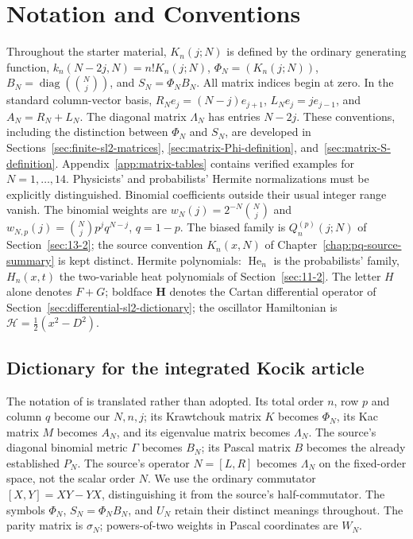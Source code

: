 \documentclass[11pt,oneside]{amsbook}
\theoremstyle{definition}
\theoremstyle{remark}
\begin{document}
\chapter*{Notation and Conventions}
Throughout the starter material, $K_n(j;N)$ is defined by the ordinary generating function, $k_n(N-2j,N)=n!K_n(j;N)$, $\Phi_N=(K_n(j;N))$, $B_N=\operatorname{diag}(\binom Nj)$, and $S_N=\Phi_NB_N$. All matrix indices begin at zero. In the standard column-vector basis,
$R_Ne_j=(N-j)e_{j+1}$, $L_Ne_j=je_{j-1}$, and $A_N=R_N+L_N$.
The diagonal matrix $\Lambda_N$ has entries $N-2j$.
These conventions, including the distinction between $\Phi_N$ and
$S_N$, are developed in Sections~\ref{sec:finite-sl2-matrices},
\ref{sec:matrix-Phi-definition}, and~\ref{sec:matrix-S-definition}.
Appendix~\ref{app:matrix-tables} contains verified examples for
$N=1,\ldots,14$. Physicists' and probabilists' Hermite normalizations must be explicitly distinguished. Binomial coefficients outside their usual integer range vanish.
The binomial weights are $w_N(j)=2^{-N}\binom Nj$ and
$w_{N,p}(j)=\binom Njp^jq^{N-j}$, $q=1-p$. The biased family is
$Q_n^{(p)}(j;N)$ of Section~\ref{sec:13-2}; the source convention
$K_n(x,N)$ of Chapter~\ref{chap:pq-source-summary} is kept distinct.
Hermite polynomials: $\operatorname{He}_n$ is the probabilists' family,
$H_n(x,t)$ the two-variable heat polynomials of Section~\ref{sec:11-2}.
The letter $H$ alone denotes $F+G$; boldface $\mathbf H$ denotes the Cartan differential operator of Section~\ref{sec:differential-sl2-dictionary}; the oscillator Hamiltonian is
$\mathcal H=\frac12(x^2-D^2)$.

\section*{Dictionary for the integrated Kocik article}
The notation of \cite{KocikFeynman} is translated rather than adopted.
Its total order $n$, row $p$ and column $q$ become our $N,n,j$;
its Krawtchouk matrix $K$ becomes $\Phi_N$, its Kac matrix $M$ becomes
$A_N$, and its eigenvalue matrix becomes $\Lambda_N$.
The source's diagonal binomial metric $\Gamma$ becomes $B_N$;
its Pascal matrix $B$ becomes the already established $P_N$.
The source's operator $N=[L,R]$ becomes $\Lambda_N$ on the fixed-order
space, not the scalar order $N$. We use the ordinary commutator
$[X,Y]=XY-YX$, distinguishing it from the source's half-commutator.
The symbols $\Phi_N$, $S_N=\Phi_NB_N$, and $U_N$ retain their distinct
meanings throughout. The parity matrix is $\sigma_N$; powers-of-two weights
in Pascal coordinates are $W_N$.
\end{document}
